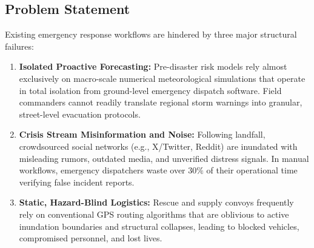 \documentclass{article}
\begin{document}
\subsection{Problem Statement}
Existing emergency response workflows are hindered by three major structural failures:
\begin{enumerate}[label=\textbf{\arabic*.}]
    \item \textbf{Isolated Proactive Forecasting:} Pre-disaster risk models rely almost exclusively on macro-scale numerical meteorological simulations that operate in total isolation from ground-level emergency dispatch software. Field commanders cannot readily translate regional storm warnings into granular, street-level evacuation protocols.
    \item \textbf{Crisis Stream Misinformation and Noise:} Following landfall, crowdsourced social networks (e.g., X/Twitter, Reddit) are inundated with misleading rumors, outdated media, and unverified distress signals. In manual workflows, emergency dispatchers waste over $30\%$ of their operational time verifying false incident reports.
    \item \textbf{Static, Hazard-Blind Logistics:} Rescue and supply convoys frequently rely on conventional GPS routing algorithms that are oblivious to active inundation boundaries and structural collapses, leading to blocked vehicles, compromised personnel, and lost lives.
\end{enumerate}
\end{document}
